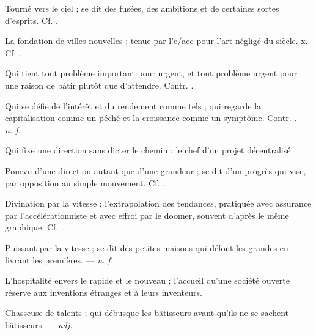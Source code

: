  Tourné vers le ciel ; se dit des fusées, des ambitions et de certaines sortes d'esprits. Cf. .

 La fondation de villes nouvelles ; tenue par l'e/acc pour l'art négligé du siècle.   x. Cf. .

 Qui tient tout problème important pour urgent, et tout problème urgent pour une raison de bâtir plutôt que d'attendre. Contr. .

 Qui se défie de l'intérêt et du rendement comme tels ; qui regarde la capitalisation comme un péché et la croissance comme un symptôme. Contr. . ---  \textit{n. f.}

 Qui fixe une direction sans dicter le chemin ; le chef d'un projet décentralisé.

 Pourvu d'une direction autant que d'une grandeur ; se dit d'un progrès qui vise, par opposition au simple mouvement. Cf. .

 Divination par la vitesse ; l'extrapolation des tendances, pratiquée avec assurance par l'accélérationniste et avec effroi par le doomer, souvent d'après le même graphique. Cf. .

 Puissant par la vitesse ; se dit des petites maisons qui défont les grandes en livrant les premières. ---  \textit{n. f.}

 L'hospitalité envers le rapide et le nouveau ; l'accueil qu'une société ouverte réserve aux inventions étranges et à leurs inventeurs.

 Chasseuse de talents ; qui débusque les bâtisseurs avant qu'ils ne se sachent bâtisseurs. ---  \textit{adj.}


